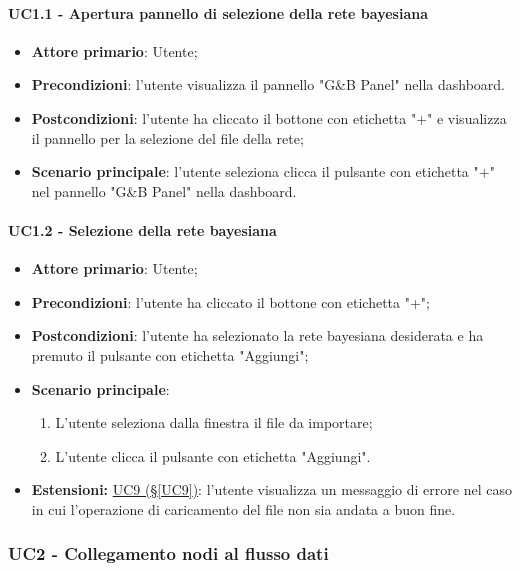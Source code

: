 \paragraph{UC1.1 - Apertura pannello di selezione della rete bayesiana}\label{UC1.1}
\begin{itemize}
	\item \textbf{Attore primario}: Utente; 
	\item \textbf{Precondizioni}: l'utente visualizza il pannello "G\&B Panel" nella dashboard.
	\item \textbf{Postcondizioni}: l'utente ha cliccato il bottone con etichetta "+" e visualizza il pannello per la selezione del file della rete;
	\item \textbf{Scenario principale}: l'utente seleziona clicca il pulsante con etichetta "+" nel pannello "G\&B Panel" nella dashboard.
\end{itemize}


\paragraph{UC1.2 - Selezione della rete bayesiana}\label{UC1.2}
\begin{itemize}
	\item \textbf{Attore primario}: Utente;
	\item \textbf{Precondizioni}: l'utente ha cliccato il bottone con etichetta "+";
	\item \textbf{Postcondizioni}: l'utente ha selezionato la rete bayesiana desiderata e ha premuto il pulsante con etichetta "Aggiungi";
	\item \textbf{Scenario principale}:
	\begin{enumerate}
		\item L'utente seleziona dalla finestra il file da importare;
		\item L'utente clicca il pulsante con etichetta "Aggiungi".
	\end{enumerate}
	\item \textbf{Estensioni:} \hyperref[UC9]{UC9 (§\ref*{UC9})}: l'utente visualizza un messaggio di errore nel caso in cui l'operazione di caricamento del file non sia andata a buon fine.
\end{itemize}

\pagebreak

\subsubsection{UC2 - Collegamento nodi al flusso dati}\label{UC2}

